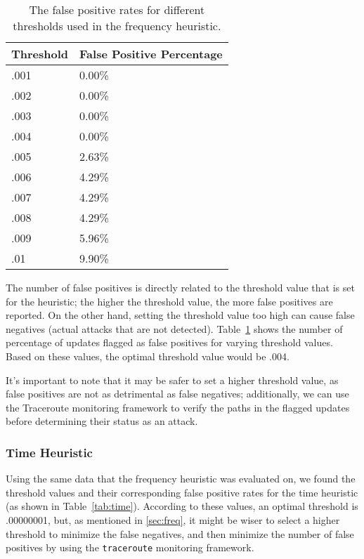 \begin{table}[h]
\begin{center}
    \begin{tabular}{| l | l |}
    \hline
    Threshold & False Positive Percentage \\ \hline \hline
    .001 & 0.00\% \\ \hline
    .002 & 0.00\% \\ \hline
    .003 & 0.00\% \\ \hline
    .004 & 0.00\% \\ \hline
    .005 & 2.63\% \\ \hline
    .006 & 4.29\% \\ \hline
    .007 & 4.29\% \\ \hline
    .008 & 4.29\% \\ \hline
    .009 & 5.96\% \\ \hline
    .01 & 9.90\% \\
    \hline
    \end{tabular}
\end{center}
\caption{The false positive rates for different thresholds used in the frequency heuristic.}
\label{tab:frequency}
\end{table}

The number of false positives is directly related to the threshold value that is set for the heuristic; the higher the threshold value, the more false positives are reported.  On the other hand, setting the threshold value too high can cause false negatives (actual attacks that are not detected).  Table~\ref{tab:frequency} shows the number of percentage of updates flagged as false positives for varying threshold values.  Based on these values, the optimal threshold value would be .004.  

It's important to note that it may be safer to set a higher threshold value, as false positives are not as detrimental as false negatives; additionally, we can use the Traceroute monitoring framework to verify the paths in the flagged updates before determining their status as an attack.  

\subsubsection{Time Heuristic}

Using the same data that the frequency heuristic was evaluated on, we found the threshold values and their corresponding false positive rates for the time heuristic (as shown in Table~\ref{tab:time}).  According to these values, an optimal threshold is .00000001, but, as mentioned in \ref{sec:freq}, it might be wiser to select a higher threshold to minimize the false negatives, and then minimize the number of false positives by using the {\tt traceroute} monitoring framework.

